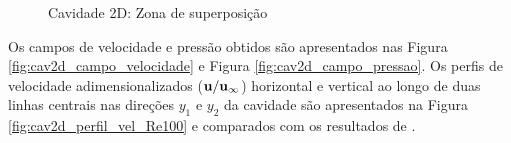 \begin{figure}[!htbp]
	\caption{Cavidade 2D: Zona de superposição}
	\centering
\end{figure}

Os campos de velocidade e pressão obtidos são apresentados nas Figura \ref{fig:cav2d_campo_velocidade} e Figura \ref{fig:cav2d_campo_pressao}. Os perfis de velocidade adimensionalizados ($\mathbf{u}/\mathbf{u}_{\infty}$) horizontal e vertical ao longo de duas linhas centrais nas direções $y_1$ e $y_2$ da cavidade são apresentados na Figura \ref{fig:cav2d_perfil_vel_Re100} e comparados com os resultados de .

